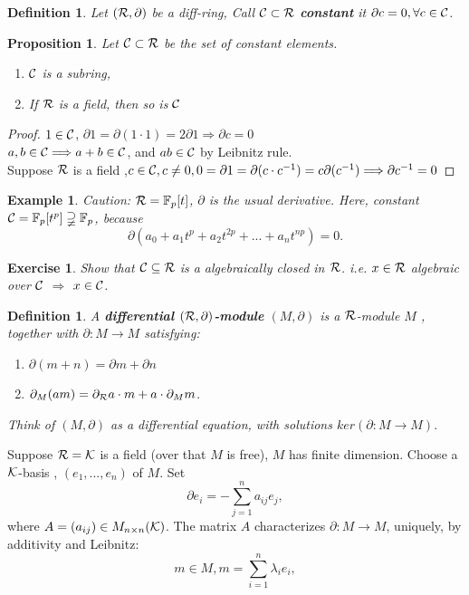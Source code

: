 \documentclass[11pt]{article}
\newtheorem{prop}[thm]{Proposition}
\newtheorem{exercise}[thm]{Exercise}
\newtheorem{dfn}[thm]{Definition}
\newtheorem{ex}[thm]{Example}
\newcommand{\pd}{\partial}
\newcommand{\bbf}{\mathbb F}
\newcommand{\calc}{{\cal C}}
\newcommand{\calk}{{\cal K}}
\newcommand{\calr}{{\cal R}}
\begin{document}
\begin{dfn}
Let $(\calr, \pd)$ be a diff-ring, Call $\calc\subset\calr$ \textbf{constant} it $\pd c=0,\forall c\in \calc$.
\end{dfn}

\begin{prop}
Let $\calc\subset\calr$ be the set of constant elements.
\begin{enumerate}
\item $\calc$ is a subring,
\item If $\calr$ is a field, then so is $\calc$
\end{enumerate}
\end{prop}
\begin{proof}
$1\in\calc$, $\pd 1=\pd (1\cdot 1)=2\pd 1\Longrightarrow \pd c=0$\\
$a,b\in \calc\Longrightarrow a+b\in \calc$, and $ab\in\calc$ by Leibnitz rule.\\
Suppose $\calr$ is a field ,$c\in \calc, c\neq 0, 0=\pd 1=\pd (c\cdot c^{-1})=c\pd (c^{-1})\Longrightarrow \pd c^{-1}=0$
\end{proof}
\begin{ex}
Caution: $\calr=\bbf_p[t]$, $\pd$ is the usual derivative. Here, constant $\calc= \bbf_p[t^p]\supsetneqq \bbf_p$, because
$$
\pd(a_0+a_1 t^p+a_2 t^{2p}+...+a_n t^{np})=0.
$$
\end{ex}

\begin{exercise}
Show that $\calc \subseteq \calr$ is a algebraically closed in $\calr$. i.e. $x\in \calr$ algebraic over $\calc$ $\Longrightarrow$ $x\in \calc$.
\end{exercise}

\begin{dfn}
A \textbf{differential $(\calr, \pd)$-module} $(M,\pd)$ is a $\calr$-module  $M$ , together with $\pd: M\rightarrow M $ satisfying:
\begin{enumerate}
\item $\pd(m+n)=\pd m+\pd n$
\item $\pd_M(a m)=\pd_\calr a \cdot m+a\cdot \pd_M m$.
\end{enumerate}
Think of $(M,\pd)$ as a differential equation, with solutions $ker(\pd :M\rightarrow M).$
\end{dfn}
Suppose $\calr=\calk$ is a field (over that $M$ is free), $M $ has finite dimension.
Choose a $\calk$-basis , $(e_1,...,e_n)$ of $M$.
Set
$$
\pd e_i=-\sum_{j=1}^n a_{ij} e_j,
$$
where $A=(a_{ij})\in  M_{n \times n}(\calk)$. 
The matrix $A$ characterizes $\pd :M\rightarrow M$, uniquely, by additivity and Leibnitz:
$$
m\in M, m=\sum_{i=1}^n \lambda_i e_i,
$$
\end{document}
